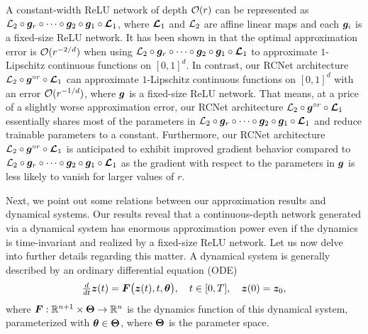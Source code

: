 \documentclass[nohyperref]{article}
\theoremstyle{plain}
\theoremstyle{definition}
\theoremstyle{remark}
\begin{document}
A constant-width ReLU network of depth ${\mathcal{O}}(r)$ can be represented as ${\mathcal{L}}_2\circ {\bm{g}}_r\circ\mathinner{\mkern-0.1mu\cdotp\mkern-0.3mu\cdotp\mkern-0.3mu\cdotp\mkern-0.1mu}\circ{\bm{g}}_2 \circ {\bm{g}}_1\circ {\bm{\mathcal{L}}}_1$, where ${\bm{\mathcal{L}}}_1$ and ${\mathcal{L}}_2$ are affine linear maps and each ${\bm{g}}_i$ is a fixed-size ReLU network. 
It has been shown in \cite{shijun:2,yarotsky18a,shijun:thesis}  that the optimal approximation error is ${\mathcal{O}}(r^{-2/d})$ when using ${\mathcal{L}}_2\circ {\bm{g}}_r\circ \mathinner{\mkern-0.1mu\cdotp\mkern-0.3mu\cdotp\mkern-0.3mu\cdotp\mkern-0.1mu} \circ {\bm{g}}_2\circ {\bm{g}}_1\circ {\bm{\mathcal{L}}}_1$ to approximate $1$-Lipschitz continuous functions on $[0,1]^d$. In contrast, our RCNet architecture ${\mathcal{L}}_2\circ {\bm{g}}^{\circ r}\circ {\bm{\mathcal{L}}}_1$ can approximate $1$-Lipschitz continuous functions on $[0,1]^d$ with an error ${\mathcal{O}}(r^{-1/d})$, where ${\bm{g}}$ is a fixed-size ReLU network. That means, at a price of a slightly worse approximation error, our RCNet architecture ${\mathcal{L}}_2\circ {\bm{g}}^{\circ r}\circ {\bm{\mathcal{L}}}_1$ essentially shares most of the parameters in  ${\mathcal{L}}_2\circ {\bm{g}}_r\circ \mathinner{\mkern-0.1mu\cdotp\mkern-0.3mu\cdotp\mkern-0.3mu\cdotp\mkern-0.1mu} \circ{\bm{g}}_2\circ {\bm{g}}_1\circ {\bm{\mathcal{L}}}_1$ and reduce trainable parameters to a constant. 
Furthermore, our RCNet architecture $\mathcal{L}_2 \circ {\bm{g}}^{\circ r} \circ {\bm{\mathcal{L}}}_1$ is anticipated to exhibit improved gradient behavior compared to $\mathcal{L}_2 \circ {\bm{g}}_r \circ \mathinner{\mkern-0.1mu\cdotp\mkern-0.3mu\cdotp\mkern-0.3mu\cdotp\mkern-0.1mu} \circ {\bm{g}}_2 \circ {\bm{g}}_1 \circ {\bm{\mathcal{L}}}_1$ as the gradient with respect to the parameters in ${\bm{g}}$ is less likely to vanish for larger values of $r$.

Next, we point out some relations between our approximation results and dynamical systems. Our results reveal that a continuous-depth network generated via a dynamical system has enormous approximation power even if the dynamics is time-invariant
and realized by a fixed-size ReLU network. 
 Let us now delve into further details regarding this matter.
A dynamical system is generally described by an ordinary differential equation
(ODE)
\begin{equation}
    \label{eq:dynamical:system:def}
    \tfrac{d }{d t}{\bm{z}}(t)= {\bm{F}}\big({\bm{z}}(t),t,{\bm{\theta}}\big),\quad t\in [0,T],\quad  {\bm{z}}(0)={\bm{z}}_0,
\end{equation}
where $\bmF:\R^{n+1}\times \bmTheta\to\R^n$ is the dynamics function of this dynamical system, parameterized with ${\bm{\theta}}\in{\bm{\Theta}}$, where ${\bm{\Theta}}$ is the parameter space.  
\end{document}
